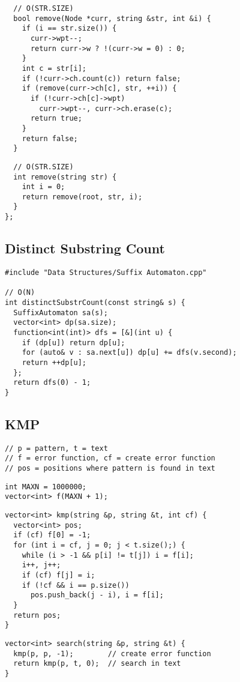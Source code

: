 \documentclass[twoside]{article}
\begin{document}
\begin{multicols*}{2}
\begin{verbatim}
  // O(STR.SIZE)
  bool remove(Node *curr, string &str, int &i) {
    if (i == str.size()) {
      curr->wpt--;
      return curr->w ? !(curr->w = 0) : 0;
    }
    int c = str[i];
    if (!curr->ch.count(c)) return false;
    if (remove(curr->ch[c], str, ++i)) {
      if (!curr->ch[c]->wpt)
        curr->wpt--, curr->ch.erase(c);
      return true;
    }
    return false;
  }
\end{verbatim}
\vspace{-12pt}
\begin{verbatim}
  // O(STR.SIZE)
  int remove(string str) {
    int i = 0;
    return remove(root, str, i);
  }
};
\end{verbatim}

\subsectionfont{\large\bfseries\sffamily\underline}
\subsection*{Distinct Substring Count}
\begin{verbatim}
#include "Data Structures/Suffix Automaton.cpp"

// O(N)
int distinctSubstrCount(const string& s) {
  SuffixAutomaton sa(s);
  vector<int> dp(sa.size);
  function<int(int)> dfs = [&](int u) {
    if (dp[u]) return dp[u];
    for (auto& v : sa.next[u]) dp[u] += dfs(v.second);
    return ++dp[u];
  };
  return dfs(0) - 1;
}
\end{verbatim}

\subsectionfont{\large\bfseries\sffamily\underline}
\subsection*{KMP}
\begin{verbatim}
// p = pattern, t = text
// f = error function, cf = create error function
// pos = positions where pattern is found in text
\end{verbatim}
\vspace{-12pt}
\begin{verbatim}
int MAXN = 1000000;
vector<int> f(MAXN + 1);
\end{verbatim}
\vspace{-12pt}
\begin{verbatim}
vector<int> kmp(string &p, string &t, int cf) {
  vector<int> pos;
  if (cf) f[0] = -1;
  for (int i = cf, j = 0; j < t.size();) {
    while (i > -1 && p[i] != t[j]) i = f[i];
    i++, j++;
    if (cf) f[j] = i;
    if (!cf && i == p.size())
      pos.push_back(j - i), i = f[i];
  }
  return pos;
}
\end{verbatim}
\vspace{-12pt}
\begin{verbatim}
vector<int> search(string &p, string &t) {
  kmp(p, p, -1);        // create error function
  return kmp(p, t, 0);  // search in text
}
\end{verbatim}


\end{multicols*}
\end{document}
